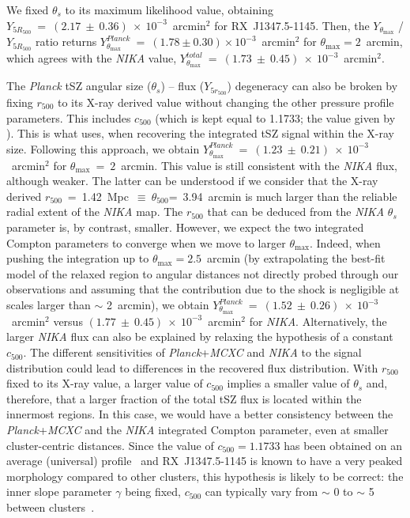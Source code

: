 \begin{itemize}
\item {We fixed $\theta_s$ to its maximum likelihood value, obtaining $Y_{5R_{500}}~=~(2.17~\pm~0.36)~\times~10^{-3}$~arcmin$^2$ for \mbox{RX~J1347.5-1145}. Then, the $Y_{\theta_{\mathrm{max}}}$ / $Y_{5R_{500}}$ ratio returns $Y^{Planck}_{\theta_{\mathrm{max}}}$~=~$(1.78 \pm 0.30) \times 10^{-3}$~arcmin$^2$ for $\theta_{\mathrm{max}} = 2$~arcmin, which agrees with the {\it NIKA} value, $Y^{total}_{\theta_{\mathrm{max}}}$~=~$(1.73~\pm~0.45)~\times~10^{-3}$~arcmin$^2$.  
\item The {\it Planck} tSZ angular size ($\theta_s$) -- flux ($Y_{5r_{500}}$) degeneracy can also be broken by fixing $r_{500}$ to its \mbox{X-ray} derived value without changing the other pressure profile parameters. This includes $c_{500}$ (which is kept equal to 1.1733; the value given by \citealp{arnaud_2010}). This is what \citealp{Planck_survey} uses, when recovering the integrated tSZ signal within the \mbox{X-ray} size. Following this approach, we obtain $Y^{Planck}_{\theta_{\mathrm{max}}}$~=~$(1.23~\pm~0.21)~\times~10^{-3}$~arcmin$^2$ for $\theta_{\mathrm{max}}~=~2$~arcmin. This value is still consistent with the {\it NIKA} flux, although weaker. The latter can be understood if we consider that the \mbox{X-ray} derived $r_{500}$~=~1.42~Mpc~$\equiv~\theta_{500}$=~3.94~arcmin \citep[{\it MCXC},][]{MCXC} is much larger than the reliable radial extent of the {\it NIKA} map. The $r_{500}$ that can be deduced from the {\it NIKA} $\theta_s$ parameter is, by contrast, smaller. However, we expect the two integrated Compton parameters to converge when we move to larger $\theta_{\mathrm{max}}$. Indeed, when pushing the integration up to $\theta_{\mathrm{max}} = 2.5$~arcmin (by extrapolating the best-fit model of the relaxed region to angular distances not directly probed through our observations and assuming that the contribution due to the shock is negligible at scales larger than $\sim$ 2~arcmin), we obtain $Y^{Planck}_{\theta_{\mathrm{max}}}$~=~$(1.52~\pm~0.26)~\times~10^{-3}$~arcmin$^2$ versus $(1.77~\pm~0.45)~\times~10^{-3}$~arcmin$^2$ for {\it NIKA}. Alternatively, the larger {\it NIKA} flux can also be explained by relaxing the hypothesis of a constant $c_{500}$. The different sensitivities of {\it Planck}+{\it MCXC} and {\it NIKA} to the signal distribution could lead to differences in the recovered flux distribution. With $r_{500}$ fixed to its \mbox{X-ray} value, a larger value of $c_{500}$ implies a smaller value of  $\theta_s$ and, therefore, that a larger fraction of the total tSZ flux is located within the innermost regions. In this case, we would have a better consistency between  the {\it Planck}+{\it MCXC} and the {\it NIKA} integrated Compton parameter, even at smaller cluster-centric distances. Since the value of $c_{500}=1.1733$ has been obtained on an average (universal) profile~\citep{arnaud_2010} and \mbox{RX~J1347.5-1145} is known to have a very peaked morphology compared to other clusters, this hypothesis is likely to be correct: the inner slope parameter $\gamma$ being fixed, $c_{500}$ can typically vary from $\sim$ 0 to $\sim$ 5 between clusters~\citep{planck_pp}.}
\end{itemize}

